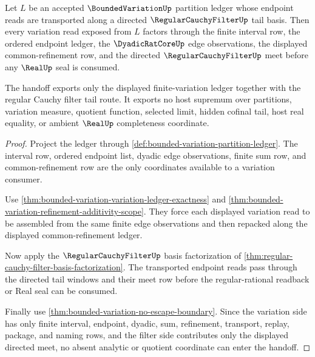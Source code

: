 \begin{theorem}
\label{thm:bounded-variation-regular-cauchy-filter-handoff}
Let $L$ be an accepted $\BoundedVariationUp$ partition ledger whose endpoint reads are transported along a directed $\RegularCauchyFilterUp$ tail basis. Then every variation read exposed from $L$ factors through the finite interval row, the ordered endpoint ledger, the $\DyadicRatCoreUp$ edge observations, the displayed common-refinement row, and the directed $\RegularCauchyFilterUp$ meet before any $\RealUp$ seal is consumed.

The handoff exports only the displayed finite-variation ledger together with the regular Cauchy filter tail route. It exports no host supremum over partitions, variation measure, quotient function, selected limit, hidden cofinal tail, host real equality, or ambient $\RealUp$ completeness coordinate.
\end{theorem}
\begin{proof}
Project the ledger through \autoref{def:bounded-variation-partition-ledger}. The interval row, ordered endpoint list, dyadic edge observations, finite sum row, and common-refinement row are the only coordinates available to a variation consumer.

Use \autoref{thm:bounded-variation-variation-ledger-exactness} and \autoref{thm:bounded-variation-refinement-additivity-scope}. They force each displayed variation read to be assembled from the same finite edge observations and then repacked along the displayed common-refinement ledger.

Now apply the $\RegularCauchyFilterUp$ basis factorization of \autoref{thm:regular-cauchy-filter-basis-factorization}. The transported endpoint reads pass through the directed tail windows and their meet row before the regular-rational readback or Real seal can be consumed.

Finally use \autoref{thm:bounded-variation-no-escape-boundary}. Since the variation side has only finite interval, endpoint, dyadic, sum, refinement, transport, replay, package, and naming rows, and the filter side contributes only the displayed directed meet, no absent analytic or quotient coordinate can enter the handoff.
\end{proof}

